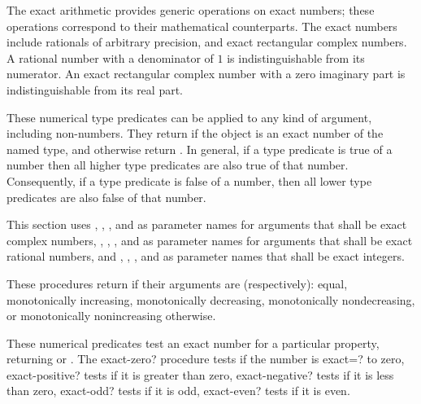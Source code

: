 The exact arithmetic provides generic operations on exact numbers;
these operations correspond to their mathematical counterparts.  The
exact numbers include rationals of arbitrary precision, and exact
rectangular complex numbers.  A rational number with a denominator of
$1$ is indistinguishable from its numerator.  An exact rectangular
complex number with a zero imaginary part is indistinguishable from
its real part.

\begin{entry}{%
}

These numerical type predicates can be applied to any kind of
argument, including non-numbers.  They return \schtrue{} if the object
is an exact number of the named type, and otherwise return
\schfalse{}.  In general, if a type predicate is true of a number then
all higher type predicates are also true of that number.
Consequently, if a type predicate is false of a number, then all lower
type predicates are also false of that number.
\end{entry}

This section uses , , , and  as
parameter names for arguments that shall be exact complex numbers, ,
, , and  as parameter names for arguments 
that shall be exact rational numbers, and , , , and
 as parameter names that shall be exact integers.

\begin{entry}{%
}

These procedures return \schtrue{} if their arguments are
(respectively): equal, monotonically increasing, monotonically
decreasing, monotonically nondecreasing, or monotonically
nonincreasing \schfalse{} otherwise.
\end{entry}

\begin{entry}{%
}

These numerical predicates test an exact number for a particular
property, returning \schtrue{} or \schfalse{}.  The {\cf exact-zero?} procedure
tests if the number is {\cf exact=?} to zero, {\cf exact-positive?}
tests if it is greater than zero, {\cf exact-negative?} tests if it is
less than zero, {\cf exact-odd?} tests if it is odd, {\cf exact-even?}
tests if it is even.
\end{entry}

